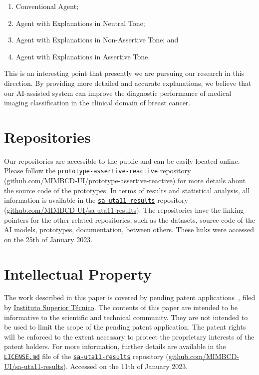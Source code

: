 \vspace{0.05mm}

\begin{enumerate}
\item Conventional Agent;
\item Agent with Explanations in Neutral Tone;
\item Agent with Explanations in Non-Assertive Tone; and
\item Agent with Explanations in Assertive Tone.
\end{enumerate}

\vspace{0.5mm}

This is an interesting point that presently we are pursuing our research in this direction.
By providing more detailed and accurate explanations, we believe that our \ac{AI}-assisted system can improve the diagnostic performance of medical imaging classification in the clinical domain of breast cancer.

\section{Repositories}
\label{sec:app001sec010}

Our repositories are accessible to the public and can be easily located online.
Please follow the \texttt{\href{https://github.com/MIMBCD-UI/prototype-assertive-reactive}{prototype-assertive-reactive}} repository (\href{https://github.com/MIMBCD-UI/prototype-assertive-reactive}{github.com/MIMBCD-UI/prototype-assertive-reactive}) for more details about the source code of the prototypes.
In terms of results and statistical analysis, all information is available in the \texttt{\href{https://github.com/MIMBCD-UI/sa-uta11-results}{sa-uta11-results}} repository (\href{https://github.com/MIMBCD-UI/sa-uta11-results}{github.com/MIMBCD-UI/sa-uta11-results}).
The repositories have the linking pointers for the other related repositories, such as the datasets, source code of the \ac{AI} models, prototypes, documentation, between others.
These links were accessed on the 25th of January 2023.

\section{Intellectual Property}
\label{sec:app001sec011}

The work described in this paper is covered by pending patent applications~\cite{WO2022071818A1}, filed by \href{https://tecnico.ulisboa.pt}{Instituto Superior T\'{e}cnico}.
The contents of this paper are intended to be informative to the scientific and technical community.
They are not intended to be used to limit the scope of the pending patent application.
The patent rights will be enforced to the extent necessary to protect the proprietary interests of the patent holders.
For more information, further details are available in the \texttt{\href{https://github.com/MIMBCD-UI/sa-uta11-results/blob/main/LICENSE.md}{LICENSE.md}} file of the \texttt{\href{https://github.com/MIMBCD-UI/sa-uta11-results}{sa-uta11-results}} repository (\href{https://github.com/MIMBCD-UI/sa-uta11-results}{github.com/MIMBCD-UI/sa-uta11-results}).
Accessed on the 11th of January 2023.

